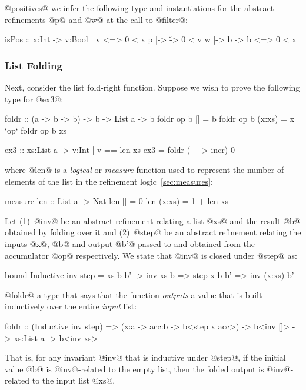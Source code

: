  @positives@ we infer the following type and
instantiations for the abstract refinements @p@ and @w@ at the
call to @filter@:
%
\begin{code}
  isPos :: x:Int -> {v:Bool | v <=> 0 < x}
  p     |-> \v    -> 0 < v
  w     |-> \x b  -> b <=> 0 < x
\end{code}

\subsubsection{List Folding}

Next, consider the list fold-right function. Suppose we
wish to prove the following type for @ex3@:
%
\begin{code}
  foldr :: (a -> b -> b) -> b -> List a -> b
  foldr op b []     = b
  foldr op b (x:xs) = x `op` foldr op b xs

  ex3 :: xs:List a -> {v:Int | v == len xs}
  ex3 = foldr (\_ -> incr) 0
\end{code}
%
where @len@ is a \emph{logical} or \emph{measure}
function used to represent the number of elements of
the list in the refinement logic~\ref{sec:measures}:
%
\begin{code}
  measure len :: List a -> Nat
  len []      = 0
  len (x:xs)  = 1 + len xs
\end{code}

 Let
(1)~@inv@ be an abstract refinement relating a list @xs@
    and the result @b@ obtained by folding over it and
(2)~@step@ be an abstract refinement relating the
    inputs @x@, @b@ and output @b'@ passed to and
    obtained from the accumulator @op@ respectively.
%
We state that @inv@ is closed under @step@ as:
%
\begin{code}
  bound Inductive inv step = \x xs b b' ->
        inv xs b => step x b b' => inv (x:xs) b'
\end{code}
%

 @foldr@ a type that says that the
function \emph{outputs} a value that is built inductively
over the entire \emph{input} list:
%
\begin{code}
  foldr :: (Inductive inv step)
        => (x:a -> acc:b -> b<step x acc>)
        -> b<inv []>
        -> xs:List a
        -> b<inv xs>
\end{code}
%
That is, for any invariant @inv@ that is inductive
under @step@, if the initial value @b@ is @inv@-related
to the empty list, then the folded output is @inv@-related
to the input list @xs@.

